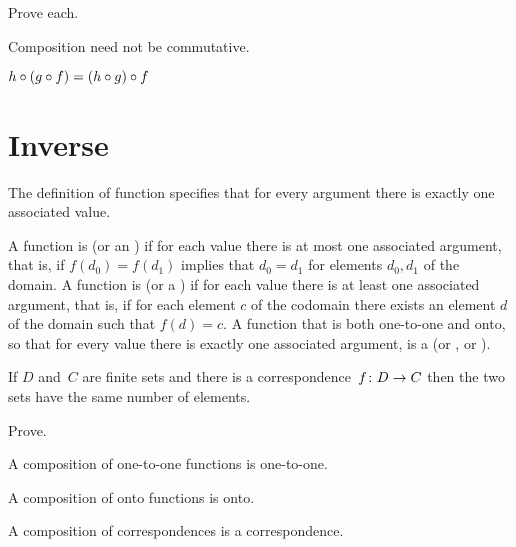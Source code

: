 \documentclass{ibl}
\begin{document}
\begin{ex}Prove each.
\begin{exes}
\item Composition need not be commutative.
\item{} 
  $h\mathbin{\circ} (g\mathbin{\circ} f)=(h\mathbin{\circ} g)\mathbin{\circ} f$    
\end{exes}
\end{ex}





\section{Inverse}

The definition of function specifies that for every argument there is 
exactly one associated value.

\begin{df}
A function is  (or an ) 
if for each value there is at most
one associated argument, that is, if $f(d_0)=f(d_1)$ implies that $d_0=d_1$
for elements $d_0,d_1$ of the domain.
A function is  (or a ) 
if for each value there is at least
one associated argument, that is, if for each element $c$ of the codomain
there exists an element $d$ of the domain such that $f(d)=c$.
A function that is both one-to-one and onto, so that for every value there
is exactly one associated argument, is a 
 (or , or ).
\end{df}

\begin{ex}
If $D$ and~$C$ are finite sets and there is a 
correspondence~$\mbox{$f\colon D\to C$}$
then the two sets
have the same number of elements.  
\end{ex}

\begin{ex} Prove.
\begin{exes}
\item A composition of one-to-one functions is one-to-one.
\item A composition of onto functions is onto.
\item A composition of correspondences is a correspondence.    
\end{exes}
\end{ex}
\end{document}
